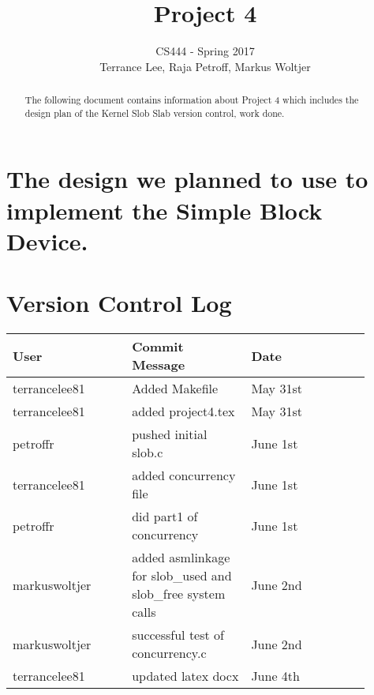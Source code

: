 \documentclass[draftclsnofoot,onecolumn,10pt,compsoc]{IEEEtran}
\begin{document}
\begin{titlepage}
	\title{Project 4}
	\author{CS444 - Spring 2017 \\ Terrance Lee, Raja Petroff, Markus Woltjer}
	\maketitle
	\begin{abstract}
		The following document contains information about Project 4 which includes the design plan of the Kernel Slob Slab version control, work done.  
	\end{abstract}
	
	\thispagestyle{empty} %
	
\end{titlepage}

\tableofcontents

\newpage

\section{The design we planned to use to implement the Simple Block Device.}
\section{Version Control Log}
\begin{center}
	\begin{tabular}{| p{0.3\linewidth} | p{0.3\linewidth} | p{0.3\linewidth} |}
		\hline User & Commit Message & Date\\
		\hline terrancelee81 & Added Makefile & May 31st\\
		\hline terrancelee81 & added project4.tex& May 31st\\
		\hline petroffr & pushed initial slob.c & June 1st \\ 	
		\hline terrancelee81 & added concurrency file & June 1st\\
		\hline petroffr & did part1 of concurrency & June 1st\\
		\hline markuswoltjer & added asmlinkage for slob_used and slob_free system calls & June 2nd\\
		\hline markuswoltjer & successful test of concurrency.c & June 2nd\\
		\hline terrancelee81 & updated latex docx & June 4th\\
	\end{tabular}
\end{center}
\end{document}
